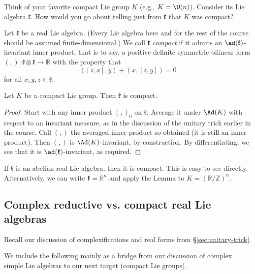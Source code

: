 \documentclass[reqno]{amsart} 
\begin{document}
Think of your favorite compact Lie group $K$ (e.g., $K = \U(n)$).  Consider its Lie algebra $\mathfrak{k}$.  How would you go about telling just from $\mathfrak{k}$ that $K$ was compact?
\begin{definition}
  Let $\mathfrak{k}$ be a real Lie algebra.  (Every Lie algebra here and for the rest of the course should be assumed finite-dimensional.)  We call $\mathfrak{k}$ \emph{compact} if it admits an $\ad(\mathfrak{k})$-invariant inner product, that is to say, a positive definite symmetric bilinear form $(,) : \mathfrak{k} \otimes \mathfrak{k} \rightarrow \mathbb{R}$ with the property that
  \begin{equation*}
    ([z,x],y) + (x,[z,y]) = 0
  \end{equation*}
  for all $x,y,z \in \mathfrak{k}$.
\end{definition}

\begin{lemma}
  Let $K$ be a compact Lie group.  Then $\mathfrak{k}$ is compact.
\end{lemma}
\begin{proof}
  Start with any inner product $(,)_0$ on $\mathfrak{k}$.  Average it under $\Ad(K)$ with respect to an invariant measure, as in the discussion of the unitary trick earlier in the course.  Call $(,)$ the averaged inner product so obtained (it is still an inner product).  Then $(,)$ is $\Ad(K)$-invariant, by construction.  By differentiating, we see that it is $\ad(\mathfrak{k})$-invariant, as required.
\end{proof}

\begin{example}\label{example:abelian-real-is-compact}
  If $\mathfrak{k}$ is an abelian real Lie algebra, then it is compact.  This is easy to see directly.  Alternatively, we can write $\mathfrak{k} = \mathbb{R}^n$ and apply the Lemma to $K = (\mathbb{R}/\mathbb{Z})^n$.
\end{example}

\subsection{Complex reductive vs. compact real Lie algebras}
\label{sec:org00eed09}
Recall our discussion of complexifications and real forms from \S\ref{sec:unitary-trick}.

We include the following mainly as a bridge from our discussion of complex simple Lie algebras to our next target (compact Lie groups).
\end{document}
